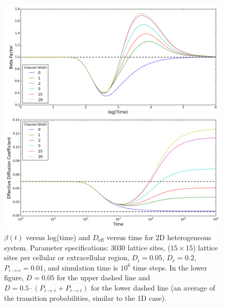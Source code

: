 	\begin{figure}[h]
		\centering
		\includegraphics[width=1.0\linewidth]{../images/2D/ye_beta_deff_2D}
		\caption{$ \beta (t) $ versus log(time) and $ D_\textrm{eff} $ versus time for 2D heterogeneous system. Parameter specifications: 3030 lattice sites, ($ 15 \times 15 $) lattice sites per cellular or extracellular region, $ D_i = 0.05 $, $ D_e = 0.2 $, $ P_{i \rightarrow e} = 0.01 $, and simulation time is $ 10^6 $ time steps. In the lower figure, $ D = 0.05 $ for the upper dashed line and $ D = 0.5 \cdot (P_{i \rightarrow e} + P_{e \rightarrow i}) $ for the lower dashed line (an average of the transition probabilities, similar to the 1D case).}
		\label{fig:ye_beta_deff_2D}
	\end{figure}

	